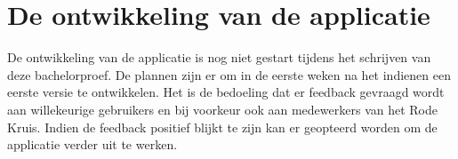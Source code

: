 \section{De ontwikkeling van de applicatie}
De ontwikkeling van de applicatie is nog niet gestart tijdens het schrijven van deze bachelorproef. De plannen zijn er om in de eerste weken na het indienen een eerste versie te ontwikkelen. Het is de bedoeling dat er feedback gevraagd wordt aan willekeurige gebruikers en bij voorkeur ook aan medewerkers van het Rode Kruis. Indien de feedback positief blijkt te zijn kan er geopteerd worden om de applicatie verder uit te werken.